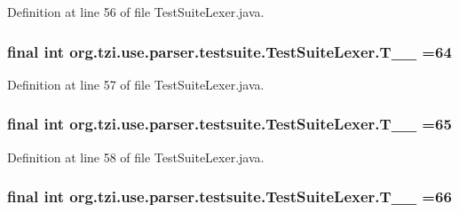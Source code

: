 Definition at line 56 of file Test\-Suite\-Lexer.\-java.

\hypertarget{classorg_1_1tzi_1_1use_1_1parser_1_1testsuite_1_1_test_suite_lexer_a1071705f23eaaf58db6504d6f67038e9}{
\subsubsection[{T\-\_\-\-\_\-64}]{\setlength{\rightskip}{0pt plus 5cm}final int org.\-tzi.\-use.\-parser.\-testsuite.\-Test\-Suite\-Lexer.\-T\-\_\-\-\_ =64\hspace{0.3cm}{\ttfamily [static]}}}\label{classorg_1_1tzi_1_1use_1_1parser_1_1testsuite_1_1_test_suite_lexer_a1071705f23eaaf58db6504d6f67038e9}


Definition at line 57 of file Test\-Suite\-Lexer.\-java.

\hypertarget{classorg_1_1tzi_1_1use_1_1parser_1_1testsuite_1_1_test_suite_lexer_aed67621c8ab4fe8fa8100173e6b50aba}{
\subsubsection[{T\-\_\-\-\_\-65}]{\setlength{\rightskip}{0pt plus 5cm}final int org.\-tzi.\-use.\-parser.\-testsuite.\-Test\-Suite\-Lexer.\-T\-\_\-\-\_ =65\hspace{0.3cm}{\ttfamily [static]}}}\label{classorg_1_1tzi_1_1use_1_1parser_1_1testsuite_1_1_test_suite_lexer_aed67621c8ab4fe8fa8100173e6b50aba}


Definition at line 58 of file Test\-Suite\-Lexer.\-java.

\hypertarget{classorg_1_1tzi_1_1use_1_1parser_1_1testsuite_1_1_test_suite_lexer_a1de787661e5ef89500e63e13e0a20b63}{
\subsubsection[{T\-\_\-\-\_\-66}]{\setlength{\rightskip}{0pt plus 5cm}final int org.\-tzi.\-use.\-parser.\-testsuite.\-Test\-Suite\-Lexer.\-T\-\_\-\-\_ =66\hspace{0.3cm}{\ttfamily [static]}}}\label{classorg_1_1tzi_1_1use_1_1parser_1_1testsuite_1_1_test_suite_lexer_a1de787661e5ef89500e63e13e0a20b63}


